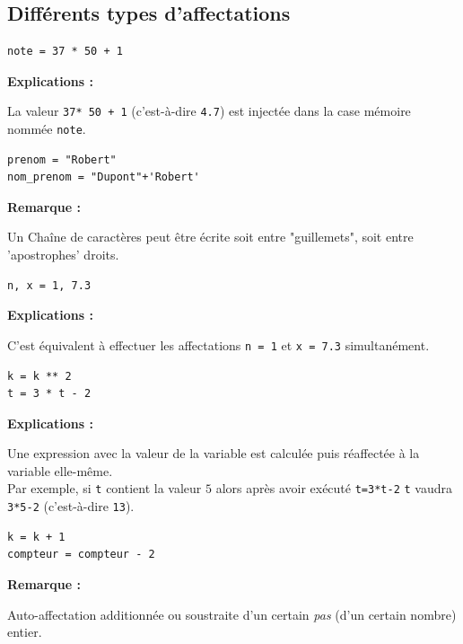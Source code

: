 \documentclass[11pt, a4paper]{book}
\begin{document}
\subsection{Différents types d’affectations}

\begin{myexamples}
	\begin{lstlisting}[numbers=none]
note = 37 * 50 + 1
	\end{lstlisting}
	\textbf{Explications :}
	\begin{minipage}[t]{0.83\linewidth}
		La valeur \lstinline{37* 50 + 1} (c'est-à-dire \lstinline{4.7}) est injectée dans la case mémoire nommée \lstinline{note}.
	\end{minipage}	
	
	\begin{lstlisting}[numbers=none]
prenom = "Robert"
nom_prenom = "Dupont"+'Robert'
	\end{lstlisting}
	\textbf{Remarque :}
	\begin{minipage}[t]{0.85\linewidth}
		Un Chaîne de caractères peut être écrite soit entre "guillemets", soit entre 'apostrophes' droits.
	\end{minipage}
	
	
	\begin{lstlisting}[numbers=none]
n, x = 1, 7.3
	\end{lstlisting}
	\textbf{Explications :}
	\begin{minipage}[t]{0.83\linewidth}
		C'est équivalent à effectuer les affectations \lstinline{n = 1} et  \lstinline{x = 7.3} simultanément.
	\end{minipage}	
	
	
	\begin{lstlisting}[numbers=none]
k = k ** 2
t = 3 * t - 2
	\end{lstlisting}
	\textbf{Explications :}
	\begin{minipage}[t]{0.83\linewidth}
		Une expression avec la valeur de la variable est calculée puis réaffectée à la variable elle-même.\\
		Par exemple, si \lstinline{t} contient la valeur $5$ alors après avoir exécuté \lstinline{t=3*t-2} \lstinline{t} vaudra  \lstinline{3*5-2} (c'est-à-dire \lstinline{13}). 
	\end{minipage}
	
	
	
	\begin{lstlisting}[numbers=none]
k = k + 1
compteur = compteur - 2
	\end{lstlisting}
	\textbf{Remarque :}
	\begin{minipage}[t]{0.85\linewidth}
		Auto-affectation additionnée ou soustraite d’un certain \textit{pas} (d’un certain nombre) entier.
	\end{minipage}
\end{myexamples}
\end{document}
